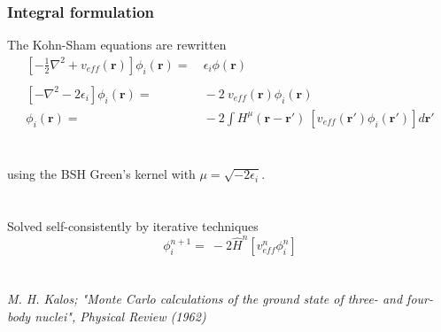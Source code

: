 \documentclass[mathserif]{beamer}
\begin{document}
\begin{frame}
    \frametitle{Integral formulation}
    The Kohn-Sham equations are rewritten
    \begin{align}
	\nonumber
	\left[-\frac{1}{2}\nabla^2 + v_{eff}(\boldsymbol{r})\right]
	\phi_i(\boldsymbol{r}) =&\ \epsilon_i \phi(\boldsymbol{r})\\
	\nonumber
	\ & \ \\
	\nonumber
	\left[-\nabla^2 - 2\epsilon_i\right]\phi_i(\boldsymbol{r}) =&\ 
	    -2\ v_{eff}(\boldsymbol{r})\phi_i(\boldsymbol{r})\\
	\nonumber
	\phi_i(\boldsymbol{r}) =&\ -2\int H^{\mu}(\boldsymbol{r}-\boldsymbol{r}')\
	    \left[v_{eff}(\boldsymbol{r}') \phi_i(\boldsymbol{r}')\right] d\boldsymbol{r}'
    \end{align}
    \ \\
    \ \\
    using the BSH Green's kernel with $\mu = \sqrt{-2\epsilon_i}$.\\
    \ \\
    \ \\
    Solved self-consistently by iterative techniques\\
    \begin{equation}
	\nonumber
	\phi_i^{n+1} =\ -2\hat{H}^n\left[v_{eff}^n\phi_i^n\right]
    \end{equation}
    \ \\
    \ \\
    \tiny \it{M. H. Kalos; "Monte Carlo calculations of the ground state of three- and 
	    four-body nuclei", Physical Review (1962)}
\end{frame}
\end{document}
